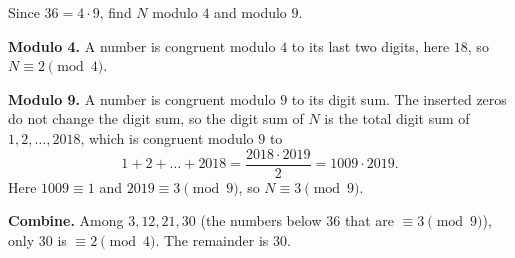 Since $36=4\cdot9$, find $N$ modulo $4$ and modulo $9$.

\textbf{Modulo 4.} A number is congruent modulo $4$ to its last two digits, here $18$, so $N\equiv2\pmod4$.

\textbf{Modulo 9.} A number is congruent modulo $9$ to its digit sum. The inserted zeros do not change the digit sum, so the digit sum of $N$ is the total digit sum of $1,2,\dots,2018$, which is congruent modulo $9$ to
\[
1+2+\dots+2018=\dfrac{2018\cdot2019}{2}=1009\cdot2019 .
\]
Here $1009\equiv1$ and $2019\equiv3\pmod9$, so $N\equiv3\pmod9$.

\textbf{Combine.} Among $3,12,21,30$ (the numbers below $36$ that are $\equiv3\pmod9$), only $30$ is $\equiv2\pmod4$. The remainder is $\boxed{30}$.

